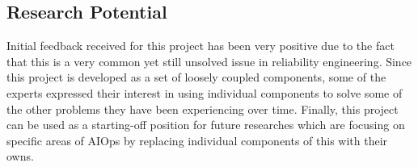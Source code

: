 \subsection{Research Potential}

Initial feedback received for this project has been very positive due to the fact that this is a very common yet still unsolved issue in reliability engineering. Since this project is developed as a set of loosely coupled components, some of the experts expressed their interest in using individual components to solve some of the other problems they have been experiencing over time. Finally, this project can be used as a starting-off position for future researches which are focusing on specific areas of AIOps by replacing individual components of this with their owns.